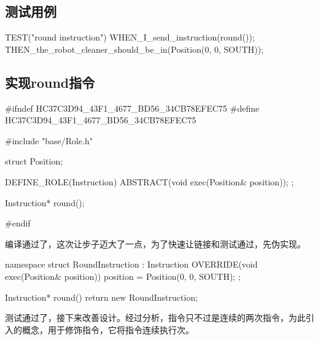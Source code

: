 \begin{content}

\subsection{测试用例}

\begin{leftbar}
\begin{c++}[caption={test/robot-cleaner/TestRobotCleaner.h}]
TEST("round instruction")
{
    WHEN_I_send_instruction(round());
    THEN_the_robot_cleaner_should_be_in(Position(0, 0, SOUTH));
}
\end{c++}
\end{leftbar}

\subsection{实现round指令}

\begin{leftbar}
\begin{c++}[caption={include/robot-cleaner/Instruction.h}]
#ifndef HC37C3D94_43F1_4677_BD56_34CB78EFEC75
#define HC37C3D94_43F1_4677_BD56_34CB78EFEC75

#include "base/Role.h"

struct Position;

DEFINE_ROLE(Instruction)
{
    ABSTRACT(void exec(Position& position));
};

Instruction* round();

#endif
\end{c++}
\end{leftbar}

编译通过了，这次让步子迈大了一点，为了快速让链接和测试通过，先伪实现。

\begin{leftbar}
\begin{c++}[caption={src/robot-cleaner/Instruction.cpp}]
namespace
{
    struct RoundInstruction : Instruction
    {
        OVERRIDE(void exec(Position& position))
        {
            position = Position(0, 0, SOUTH);
        }
    };
}

Instruction* round()
{
    return new RoundInstruction;
}
\end{c++}
\end{leftbar}

测试通过了，接下来改善设计。经过分析，指令只不过是连续的两次指令，为此引入的概念，用于修饰指令，它将指令连续执行次。


\end{content}
